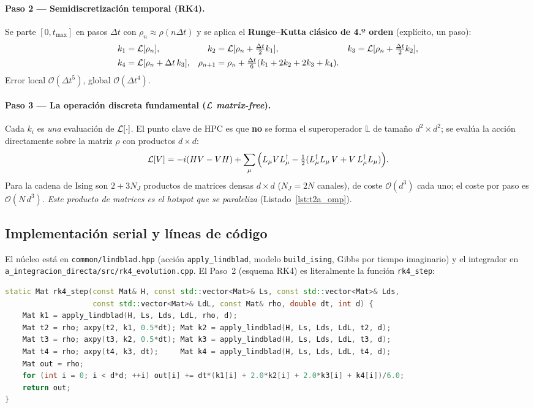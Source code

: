 \paragraph{Paso 2 — Semidiscretización temporal (RK4).} Se parte $[0,t_{\max}]$ en
pasos $\Delta t$ con $\rho_n\approx\rho(n\Delta t)$ y se aplica el
\textbf{Runge--Kutta clásico de 4.º orden} (explícito, un paso):
\begin{align*}
k_1&=\mathcal{L}[\rho_n], &
k_2&=\mathcal{L}[\rho_n+\tfrac{\Delta t}{2}k_1], &
k_3&=\mathcal{L}[\rho_n+\tfrac{\Delta t}{2}k_2], \\
k_4&=\mathcal{L}[\rho_n+\Delta t\,k_3], &
\rho_{n+1}&=\rho_n+\tfrac{\Delta t}{6}(k_1+2k_2+2k_3+k_4). &&
\end{align*}
Error local $\mathcal{O}(\Delta t^5)$, global $\mathcal{O}(\Delta t^4)$.

\paragraph{Paso 3 — La operación discreta fundamental ($\mathcal{L}$ \emph{matrix-free}).}
Cada $k_i$ es \emph{una} evaluación de $\mathcal{L}[\cdot]$. El punto clave de HPC es que
\textbf{no} se forma el superoperador $\mathbb{L}$ de tamaño $d^2\times d^2$; se
evalúa la acción directamente sobre la matriz $\rho$ con productos $d\times d$:
\[
\mathcal{L}[V]=-i(HV-VH)+\sum_\mu\Big(L_\mu V L_\mu^\dagger-\tfrac12(L_\mu^\dagger L_\mu\,V+V\,L_\mu^\dagger L_\mu)\Big).
\]
Para la cadena de Ising son $2+3N_J$ productos de matrices densas $d\times d$
($N_J=2N$ canales), de coste $\mathcal{O}(d^3)$ cada uno; el coste por paso es
$\mathcal{O}(N\,d^3)$. \emph{Este producto de matrices es el hotspot que se
paraleliza} (Listado~\ref{lst:t2a_omp}).

\subsection{Implementación serial y líneas de código}
El núcleo está en \texttt{common/lindblad.hpp} (acción \texttt{apply\_lindblad},
modelo \texttt{build\_ising}, Gibbs por tiempo imaginario) y el integrador en
\texttt{a\_integracion\_directa/src/rk4\_evolution.cpp}. El Paso~2 (esquema RK4)
es literalmente la función \texttt{rk4\_step}:

\begin{lstlisting}[language=C++,caption={Paso RK4 sobre la ecuación maestra (\texttt{rk4\_evolution.cpp}). Las cuatro etapas $k_1\dots k_4$ son cuatro llamadas a la acción matrix-free \texttt{apply\_lindblad} (Paso~3).},label={lst:t2a_rk4}]
static Mat rk4_step(const Mat& H, const std::vector<Mat>& Ls, const std::vector<Mat>& Lds,
                    const std::vector<Mat>& LdL, const Mat& rho, double dt, int d) {
    Mat k1 = apply_lindblad(H, Ls, Lds, LdL, rho, d);
    Mat t2 = rho; axpy(t2, k1, 0.5*dt); Mat k2 = apply_lindblad(H, Ls, Lds, LdL, t2, d);
    Mat t3 = rho; axpy(t3, k2, 0.5*dt); Mat k3 = apply_lindblad(H, Ls, Lds, LdL, t3, d);
    Mat t4 = rho; axpy(t4, k3, dt);     Mat k4 = apply_lindblad(H, Ls, Lds, LdL, t4, d);
    Mat out = rho;
    for (int i = 0; i < d*d; ++i) out[i] += dt*(k1[i] + 2.0*k2[i] + 2.0*k3[i] + k4[i])/6.0;
    return out;
}
\end{lstlisting}

